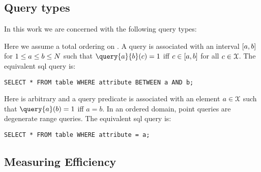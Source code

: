 	

	\subsection{Query types}

		In this work we are concerned with the following query types:
		\begin{description}[style=unboxed, leftmargin=0em]
			\item[Range queries]
				Here we assume a total ordering on \searchKeyDomain{}.
				A query  is associated with an interval $\interval{a}{b}$ for $1 \leq a \leq b \leq N$ such that $\query{a}{b}(c) = 1$ iff $c \in \interval{a}{b}$ for all $c \in \mathcal{X}$.
				The equivalent \acrshort{sql} query is:

				\smallskip
				\indent\texttt{SELECT * FROM table WHERE attribute BETWEEN a AND b;}
				\smallskip

			\item[Point queries]
				Here \searchKeyDomain{} is arbitrary and a query predicate  is associated with an element $a \in \mathcal{X}$ such that $\query{a}(b) = 1$ iff $a = b$.
				In an ordered domain, point queries are degenerate range queries.
				The equivalent \acrshort{sql} query is:

				\smallskip
				\indent\texttt{SELECT * FROM table WHERE attribute = a;}

		\end{description}

	\subsection{Measuring Efficiency}

